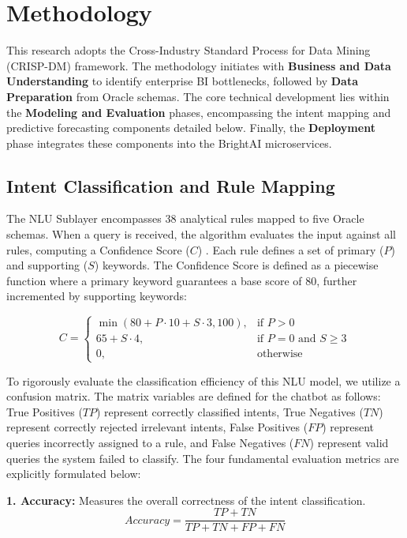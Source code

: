 \documentclass[conference]{IEEEtran}
\begin{document}
\section{Methodology}
This research adopts the Cross-Industry Standard Process for Data Mining (CRISP-DM) framework. The methodology initiates with \textbf{Business and Data Understanding} to identify enterprise BI bottlenecks, followed by \textbf{Data Preparation} from Oracle schemas. The core technical development lies within the \textbf{Modeling and Evaluation} phases, encompassing the intent mapping and predictive forecasting components detailed below. Finally, the \textbf{Deployment} phase integrates these components into the BrightAI microservices.

\subsection{Intent Classification and Rule Mapping}
The NLU Sublayer encompasses 38 analytical rules mapped to five Oracle schemas. When a query is received, the algorithm evaluates the input against all rules, computing a Confidence Score ($C$) \cite{khosla2022evaluating}. Each rule defines a set of primary ($P$) and supporting ($S$) keywords. The Confidence Score is defined as a piecewise function where a primary keyword guarantees a base score of 80, further incremented by supporting keywords:

\begin{equation}
C = \begin{cases} 
\min(80 + P \cdot 10 + S \cdot 3, 100), & \text{if } P > 0 \\
65 + S \cdot 4, & \text{if } P = 0 \text{ and } S \ge 3 \\
0, & \text{otherwise}
\end{cases}
\end{equation}

To rigorously evaluate the classification efficiency of this NLU model, we utilize a confusion matrix. The matrix variables are defined for the chatbot as follows: True Positives ($TP$) represent correctly classified intents, True Negatives ($TN$) represent correctly rejected irrelevant intents, False Positives ($FP$) represent queries incorrectly assigned to a rule, and False Negatives ($FN$) represent valid queries the system failed to classify. The four fundamental evaluation metrics are explicitly formulated below:

\textbf{1. Accuracy:} Measures the overall correctness of the intent classification.
\begin{equation}
Accuracy = \frac{TP + TN}{TP + TN + FP + FN}
\end{equation}
\end{document}
